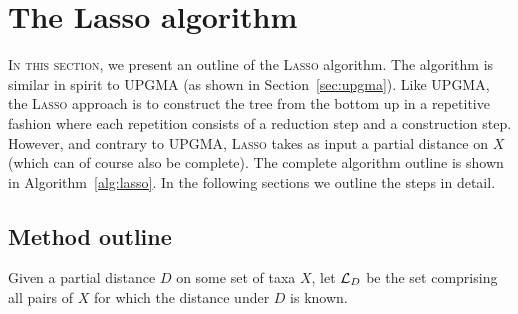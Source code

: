 
\section{The {\sc Lasso} algorithm}
\label{sec:sc-lasso-algorithm}

\textsc{In this section}, we present an outline of the \textsc{Lasso}
algorithm.  The algorithm is similar in spirit to \textsc{UPGMA} (as shown in
Section~\ref{sec:upgma}).  Like \textsc{UPGMA}, the \textsc{Lasso} approach is
to construct the tree from the bottom up in a repetitive fashion where each
repetition consists of a reduction step and a construction step.  However, and
contrary to {\sc UPGMA}, \textsc{Lasso} takes as input a partial distance on
$X$ (which can of course also be complete).  The complete algorithm outline is
shown in Algorithm~\ref{alg:lasso}.  In the following sections we outline the
steps in detail.

\subsection{Method outline}
\label{sec:method-outline}

Given a partial distance $D$ on some set of taxa $X$, let ${\mathcal L}_D$ be the set
comprising all pairs of $X$ for which the distance under $D$ is known.


